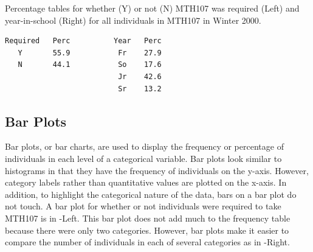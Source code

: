 \documentclass[10pt,openany]{book}\usepackage[]{graphicx}\usepackage[]{color}
\begin{document}
\begin{table}[htbp]
  \caption{Percentage tables for whether (Y) or not (N) MTH107 was required (Left) and year-in-school (Right) for all individuals in MTH107 in Winter 2000.}
  \label{tab:Mth107Prop}
  \centering
  \begin{Verbatim}[xleftmargin=5mm]
Required   Perc          Year   Perc
   Y       55.9           Fr    27.9
   N       44.1           So    17.6
                          Jr    42.6
                          Sr    13.2
  \end{Verbatim}
\end{table}

\subsection{Bar Plots}
Bar plots, or bar charts, are used to display the frequency or percentage of individuals in each level of a categorical variable. Bar plots look similar to histograms in that they have the frequency of individuals on the y-axis. However, category labels rather than quantitative values are plotted on the x-axis. In addition, to highlight the categorical nature of the data, bars on a bar plot do not touch. A bar plot for whether or not individuals were required to take MTH107 is in -Left. This bar plot does not add much to the frequency table because there were only two categories. However, bar plots make it easier to compare the number of individuals in each of several categories as in -Right.
\end{document}

